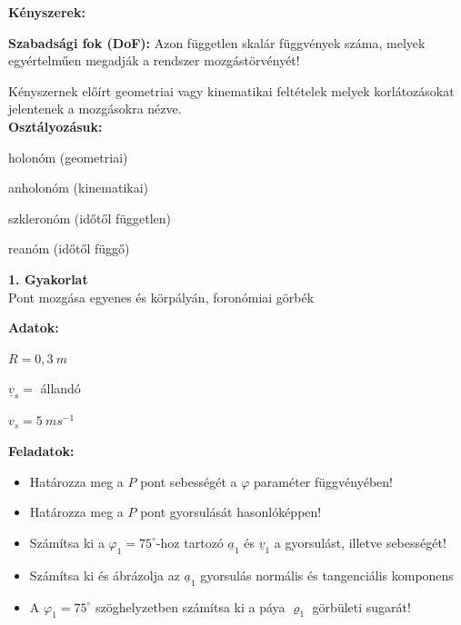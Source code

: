 \newpage
\textbf{Kényszerek:}
\begin{tcolorbox}[colback=MidnightBlue!5!white,colframe=MidnightBlue!60!black,title= Definíció]
    \textbf{Szabadsági fok (DoF):} Azon független skalár függvények száma, melyek egyértelműen megadják a rendszer mozgástörvényét!
    \end{tcolorbox}
\begin{tcolorbox}[colback=MidnightBlue!5!white,colframe=MidnightBlue!60!black,title= Definíció]
    Kényszernek előírt geometriai vagy kinematikai feltételek melyek korlátozásokat jelentenek a mozgásokra nézve.\\
    \textbf{Osztályozásuk:}
    \begin{itemize}
        \begin{multicols}{2}
        \item holonóm (geometriai)
        \item anholonóm (kinematikai)
        
        \columnbreak
        \item szkleronóm (időtől független)
        \item reanóm (időtől függő)
        \end{multicols}
    \end{itemize}
\end{tcolorbox}
\newpage
\begin{center}
    \large \textbf{1. Gyakorlat}\\
    Pont mozgása egyenes és körpályán, foronómiai görbék
\end{center}
\begin{tcolorbox}[colback=MidnightBlue!5!white,colframe=MidnightBlue!60!black,title= 1. Feladat]
    \textbf{Adatok:}
\begin{center}
    \begin{multicols}{3}
        \(R = 0,3\ m\)

        \columnbreak

        \(\underline{v}_s =\) állandó

        \columnbreak

        \(v_s = 5\ ms^{-1}\)
    \end{multicols}
\end{center}
\textbf{Feladatok:}
\begin{itemize}
    \item Határozza meg a \(P\) pont sebességét a $\varphi$ paraméter függvényében!
    \item Határozza meg a \(P\) pont gyorsulását hasonlóképpen!
    \item Számítsa ki a \(\varphi_1 = 75^{\circ}\)-hoz tartozó \(\underline{a}_1\) és \(\underline{v}_1\) a gyorsulást, illetve sebességét!
    \item Számítsa ki és ábrázolja az \(\underline{a}_1\) gyorsulás normális és tangenciális komponens
    \item A \(\varphi_1 = 75^{\circ}\) szöghelyzetben számítsa ki a páya \(\varrho_1\) görbületi sugarát!
\end{itemize}
\end{tcolorbox}
\begin{tcolorbox}[colback=MidnightBlue!5!white,colframe=MidnightBlue!60!black,title= 1. Feladat]
\end{tcolorbox}